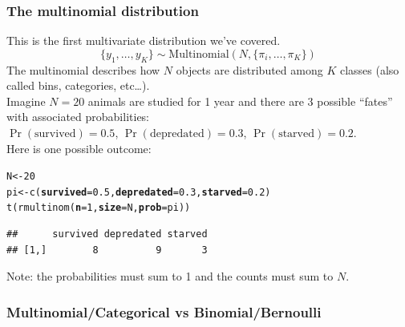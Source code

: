 \documentclass[color=usenames,dvipsnames]{beamer}\usepackage[]{graphicx}\usepackage[]{xcolor}
\makeatletter
\newcommand{\hlnum}[1]{\textcolor[rgb]{0.69,0.494,0}{#1}}%
\newcommand{\hlstd}[1]{\textcolor[rgb]{0,0,0}{#1}}%
\newcommand{\hlkwb}[1]{\textcolor[rgb]{0,0.341,0.682}{#1}}%
\newcommand{\hlkwc}[1]{\textcolor[rgb]{0,0,0}{\textbf{#1}}}%
\newcommand{\hlkwd}[1]{\textcolor[rgb]{0.004,0.004,0.506}{#1}}%
\newenvironment{kframe}{%
 \def\at@end@of@kframe{}%
 \ifinner\ifhmode%
  \def\at@end@of@kframe{\end{minipage}}%
  \begin{minipage}{\columnwidth}%
 \fi\fi%
 \def\FrameCommand##1{\hskip\@totalleftmargin \hskip-\fboxsep
 \colorbox{shadecolor}{##1}\hskip-\fboxsep
     \hskip-\linewidth \hskip-\@totalleftmargin \hskip\columnwidth}%
 \MakeFramed {\advance\hsize-\width
   \@totalleftmargin\z@ \linewidth\hsize
   \@setminipage}}%
 {\par\unskip\endMakeFramed%
 \at@end@of@kframe}
\newenvironment{knitrout}{}{} %
\makeatother
\begin{document}
\begin{frame}[fragile]
  \frametitle{The multinomial distribution}
  \small
  This is the first multivariate distribution we've covered. \\
  \[
    \{y_{1}, \dots, y_{K}\}  \sim \mathrm{Multinomial}(N, \{\pi_i, \dots, \pi_K\})
  \]
  \pause
  The multinomial describes how $N$ objects are distributed among
  $K$ classes (also called bins, categories, etc\dots). \\
  \pause
  \vfill
  Imagine $N=20$ animals are studied for 1 year and there are 3
  possible ``fates'' with associated probabilities: \\
  $\Pr(\mathrm{survived})=0.5$, $\Pr(\mathrm{depredated})=0.3$, $\Pr(\mathrm{starved})=0.2$. \\
  \pause
  \vfill
  Here is one possible outcome:
  \vspace{-6pt}
\begin{knitrout}\footnotesize
{}\color{fgcolor}\begin{kframe}
\begin{alltt}
\hlstd{N} \hlkwb{<-} \hlnum{20}
\hlstd{pi} \hlkwb{<-} \hlkwd{c}\hlstd{(}\hlkwc{survived}\hlstd{=}\hlnum{0.5}\hlstd{,} \hlkwc{depredated}\hlstd{=}\hlnum{0.3}\hlstd{,} \hlkwc{starved}\hlstd{=}\hlnum{0.2}\hlstd{)}
\hlkwd{t}\hlstd{(}\hlkwd{rmultinom}\hlstd{(}\hlkwc{n}\hlstd{=}\hlnum{1}\hlstd{,} \hlkwc{size}\hlstd{=N,} \hlkwc{prob}\hlstd{=pi))}
\end{alltt}
\begin{verbatim}
##      survived depredated starved
## [1,]        8          9       3
\end{verbatim}
\end{kframe}
\end{knitrout}
  \pause
  \centering
  Note: the probabilities must sum to 1 and the counts must sum to $N$. \\
\end{frame}



\begin{frame}[fragile]
  \frametitle{\normalsize Multinomial/Categorical vs Binomial/Bernoulli}
  \centering
   \\
\end{frame}
\end{document}
